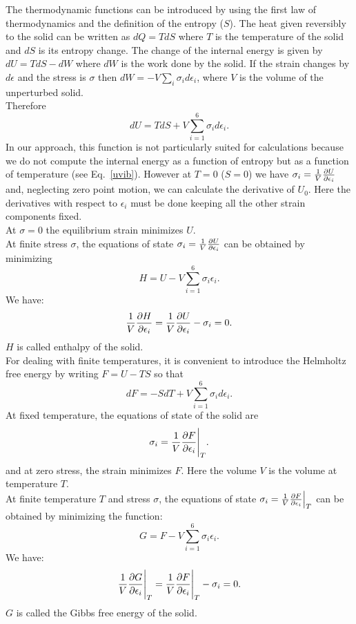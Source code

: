 \documentclass[12pt,a4paper]{article}
\begin{document}
The thermodynamic functions can be introduced by using the first law
of thermodynamics and the definition of the entropy ($S$). The heat 
given reversibly to the solid can be written as $dQ=TdS$ where $T$ is
the temperature of the solid and $dS$ is its entropy change. The change 
of the internal energy is given by $dU = TdS - dW$ where $dW$ is 
the work done by the solid. If the strain changes by $d\epsilon$ and 
the stress is $\sigma$ then $dW=-V \sum_i \sigma_i d\epsilon_i$, where $V$
is the volume of the unperturbed solid. \\
Therefore
\begin{equation}
dU=TdS + V \sum_{i=1}^6 \sigma_i d\epsilon_i.
\end{equation}
In our approach, this function is not particularly suited for 
calculations because we do not compute the internal energy as a function 
of entropy but as a function of temperature (see Eq.~\ref{uvib}). However
at $T=0$ ($S=0$) we have $\sigma_i={1 \over V} 
{\partial U \over \partial \epsilon_i}$ and, neglecting zero point motion,
we can calculate the derivative of $U_0$. 
Here the derivatives with 
respect to $\epsilon_i$ must be done keeping all the other strain 
components fixed. \\
At $\sigma=0$ the equilibrium strain minimizes $U$. \\ 
At finite stress $\sigma$, 
the equations of state $\sigma_i ={1\over V} 
{\partial U \over \partial \epsilon_i}$
can be obtained by minimizing
\begin{equation}
H= U - V \sum_{i=1}^6 \sigma_i \epsilon_i.
\end{equation}
We have:
\begin{equation}
{1\over V }{\partial H \over \partial \epsilon_i} = {1\over V} 
{\partial U \over \partial \epsilon_i}- 
\sigma_i = 0.
\end{equation}
$H$ is called enthalpy of the solid. \\
For dealing with finite temperatures, it is convenient to introduce the 
Helmholtz free energy by writing $F=U-TS$ so that
\begin{equation}
dF=-S dT + V \sum_{i=1}^6 \sigma_i d\epsilon_i.
\end{equation}
At fixed temperature, the equations of state of the solid are
\begin{equation}
\sigma_i= {1\over V }{\partial F \over \partial \epsilon_i}\Bigg|_T.
\end{equation}
and at zero stress, the strain minimizes $F$.
Here the volume $V$ is the volume at temperature $T$. \\
At finite temperature $T$ and stress $\sigma$, the equations of state
 $\sigma_i={1\over V}
{\partial F\over \partial \epsilon_i}\Big|_T$ can be obtained by 
minimizing the function:
\begin{equation}
G= F - V \sum_{i=1}^6 \sigma_i \epsilon_i.
\end{equation}
We have:
\begin{equation}
{1\over V} {\partial G \over \partial \epsilon_i}\Bigg |_T = {1\over V} {\partial F \over \partial \epsilon_i}\Bigg |_T - \sigma_i = 0.
\end{equation}
$G$ is called the Gibbs free energy of the solid.
\end{document}
